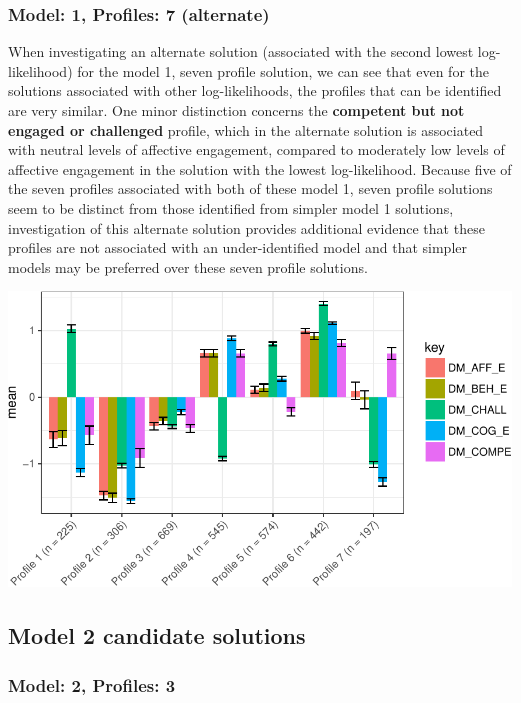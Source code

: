 \documentclass[]{msu-thesis}
\theoremstyle{definition}
\theoremstyle{definition}
\theoremstyle{definition}
\theoremstyle{remark}
\begin{document}
\subsubsection{Model: 1, Profiles: 7
(alternate)}\label{model-1-profiles-7-alternate}

When investigating an alternate solution (associated with the second
lowest log-likelihood) for the model 1, seven profile solution, we can
see that even for the solutions associated with other log-likelihoods,
the profiles that can be identified are very similar. One minor
distinction concerns the \textbf{competent but not engaged or
challenged} profile, which in the alternate solution is associated with
neutral levels of affective engagement, compared to moderately low
levels of affective engagement in the solution with the lowest
log-likelihood. Because five of the seven profiles associated with both
of these model 1, seven profile solutions seem to be distinct from those
identified from simpler model 1 solutions, investigation of this
alternate solution provides additional evidence that these profiles are
not associated with an under-identified model and that simpler models
may be preferred over these seven profile solutions.

\begin{center}\includegraphics[width=0.8\linewidth]{rosenberg-dissertation_files/figure-latex/m1_7-other-LL-p-1} \end{center}

\subsection{Model 2 candidate
solutions}\label{model-2-candidate-solutions}

\subsubsection{Model: 2, Profiles: 3}\label{model-2-profiles-3}
\end{document}
